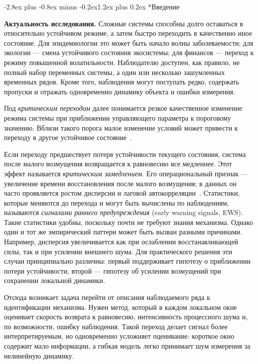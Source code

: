 \documentclass[12pt,a4paper]{article}
\makeatletter
\numberwithin{table}{section}
\numberwithin{figure}{section}
\renewcommand\section{\@startsection{section}{1}{0pt}
  {-2.8ex plus -0.8ex minus -0.2ex}{1.2ex plus 0.2ex}
  {\centering\normalfont\normalsize\bfseries}}
\newcommand{\term}[1]{\textit{#1}}
\makeatother
\begin{document}
\setcounter{tocdepth}{2}
\begingroup
{}
\tableofcontents
\endgroup
\clearpage

\section*{Введение}

\textbf{Актуальность исследования.} Сложные системы способны долго оставаться в относительно устойчивом режиме,
а затем быстро переходить в качественно иное состояние. Для эпидемиологии это
может быть начало волны заболеваемости; для экологии --- смена устойчивого
состояния экосистемы; для финансов --- переход к режиму повышенной
волатильности. Наблюдателю доступен, как правило, не полный набор переменных
системы, а один или несколько зашумленных временных рядов. Кроме того,
наблюдения могут поступать редко, содержать пропуски и отражать одновременно
динамику объекта и ошибки измерения.

Под \term{критическим переходом} далее понимается резкое качественное
изменение режима системы при приближении управляющего параметра к пороговому
значению. Вблизи такого порога малое изменение условий может привести к
переходу в другое устойчивое состояние~\cite{scheffer2009}.

Если переходу предшествует потеря устойчивости текущего состояния, система
после малого возмущения возвращается к равновесию все медленнее. Этот эффект
называется \term{критическим замедлением}. Его операциональный признак ---
увеличение времени восстановления после малого возмущения; в данных он часто
проявляется ростом дисперсии и лаговой автокорреляции~\cite{scheffer2009}.
Статистики, которые меняются до перехода и могут быть вычислены по наблюдениям,
называются \term{сигналами раннего предупреждения} (early warning signals,
EWS). Такие статистики удобны, поскольку почти не
требуют знания механизма. Однако один и тот же эмпирический паттерн может быть
вызван разными причинами. Например, дисперсия увеличивается как при ослаблении
восстанавливающей силы, так и при усилении внешнего шума. Для практического
решения эти случаи принципиально различны: первый поддерживает гипотезу о
приближении потери устойчивости, второй --- гипотезу об усилении возмущений
при сохранении локальной динамики.

Отсюда возникает задача перейти от описания наблюдаемого ряда к
идентификации механизма. Нужен метод, который в каждом локальном окне оценивает
скорость возврата к равновесию, интенсивность процессного шума и, по
возможности, ошибку наблюдения. Такой переход делает сигнал более
интерпретируемым, но одновременно усложняет оценивание: короткое окно содержит
мало информации, а гибкая модель легко принимает шум измерения за нелинейную
динамику.
\end{document}
